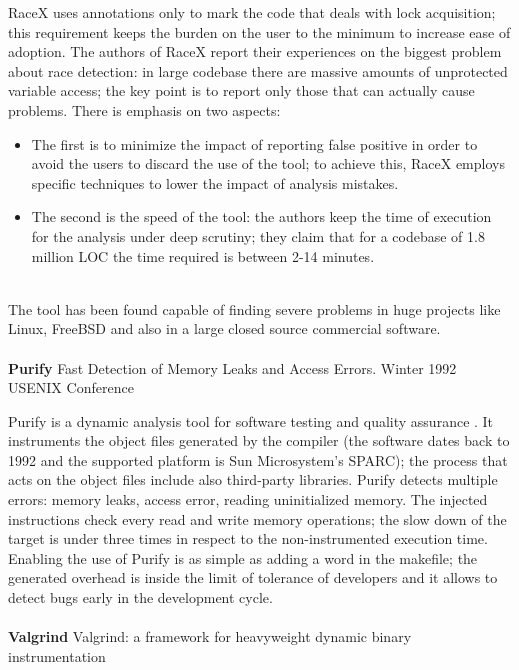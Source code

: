 RaceX uses annotations only to mark the code that deals with lock acquisition; this requirement keeps the burden on the user to the minimum to increase ease of adoption. The authors of RaceX report their experiences on the biggest problem about race detection: in large codebase there are massive amounts of unprotected variable access; the key point is to report only those that can actually cause problems. There is emphasis on two aspects:
\begin{itemize}
    \item The first is to minimize the impact of reporting false positive in order to avoid the users to discard the use of the tool; to achieve this, RaceX employs specific techniques to lower the impact of analysis mistakes.
    \item The second is the speed of the tool: the authors keep the time of execution for the analysis under deep scrutiny; they claim that for a codebase of 1.8 million LOC the time required is between 2-14 minutes.  
\end{itemize}
\\
The tool has been found capable of finding severe problems in huge projects like Linux, FreeBSD and also in a large closed source commercial software.
\\
\\
\textbf{Purify} \cite{hastings1992fast} Fast Detection of Memory Leaks and Access Errors. Winter 1992 USENIX Conference
 
 Purify is a dynamic analysis tool for software testing and quality assurance . 
 It instruments the object files generated by the compiler (the software dates back to 1992 and the supported platform is Sun Microsystem's SPARC); the process that acts on the object files  include also third-party libraries. 
 Purify detects multiple errors: memory leaks, access error, reading uninitialized memory. The injected instructions check every read and write memory operations; the slow down of the target is under three times in respect to the non-instrumented execution time. 
 Enabling the use of Purify is as simple as adding a word in the makefile; the generated overhead is inside the limit of tolerance of developers and it allows to detect bugs early in the development cycle.
\\
\\
\textbf{Valgrind} \cite{nethercote2007valgrind} Valgrind: a framework for heavyweight dynamic binary instrumentation

